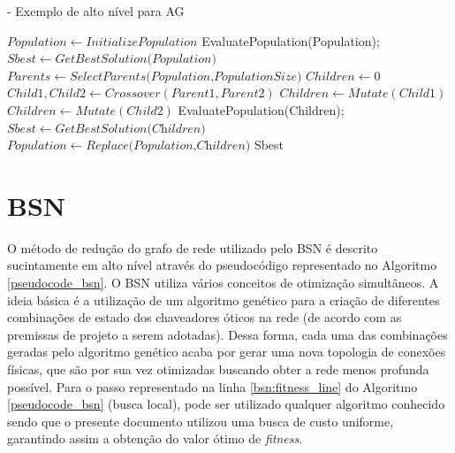 \begin{algorithm} [h]
\caption{ - Exemplo de alto nível para AG}
\begin{algorithmic}[1]
\State $Population\gets \textit{InitializePopulation}$
\State EvaluatePopulation(Population);
\State $Sbest\gets \textit{GetBestSolution(Population)}$
\State $Parents\gets \textit{SelectParents(Population,PopulationSize)}$
\State $Children\gets 0$
\State $Child1, Child2 \gets Crossover(Parent1, Parent2)$
\State $Children \gets Mutate(Child1)$
\State $Children \gets Mutate(Child2)$
\EndFor
\State EvaluatePopulation(Children);
\State $Sbest\gets \textit{GetBestSolution(Children)}$
\State $Population\gets \textit{Replace(Population,Children)}$
\EndWhile
\State\Return Sbest
\end{algorithmic}
\label{pseudocode_AG}
\end{algorithm}



\section{BSN}
O método de redução do grafo de rede utilizado pelo BSN é descrito sucintamente em alto nível através do pseudocódigo representado no Algoritmo \ref{pseudocode_bsn}. O BSN utiliza vários conceitos de otimização simultâneos. A ideia básica é a utilização de um algoritmo genético para a criação de diferentes combinações de estado dos chaveadores óticos na rede (de acordo com as premissas de projeto a serem adotadas). Dessa forma, cada uma das combinações geradas pelo algoritmo genético acaba por gerar uma nova topologia de conexões físicas, que são por sua vez otimizadas buscando obter a rede menos profunda possível. Para o passo representado na linha \ref{bsn:fitness_line} do Algoritmo \ref{pseudocode_bsn} (busca local), pode ser utilizado qualquer algoritmo conhecido sendo que o presente documento utilizou uma busca de custo uniforme, garantindo assim a obtenção do valor ótimo de \emph{fitness}.

